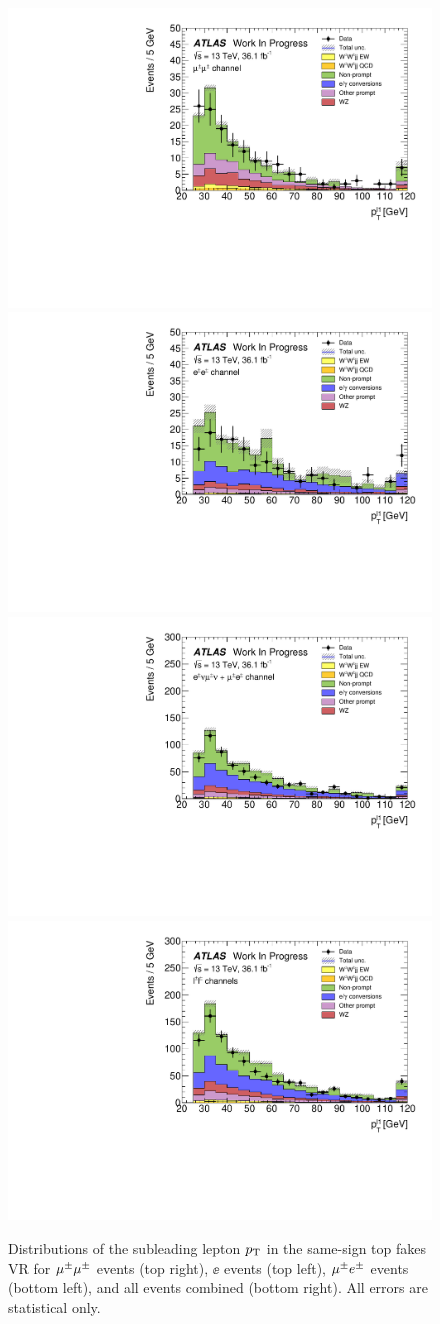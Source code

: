\begin{figure}
  \centering
  \includegraphics[width=.48\textwidth]{figs/ssww_13tev/backgrounds/ff/fakes_vr/mm-CutCRTopFakesSSZVeto-l1_pt-lin}
  \includegraphics[width=.48\textwidth]{figs/ssww_13tev/backgrounds/ff/fakes_vr/ee-CutCRTopFakesSSZVeto-l1_pt-lin}\\
  \includegraphics[width=.48\textwidth]{figs/ssww_13tev/backgrounds/ff/fakes_vr/emme-CutCRTopFakesSSZVeto-l1_pt-lin}
  \includegraphics[width=.48\textwidth]{figs/ssww_13tev/backgrounds/ff/fakes_vr/ll-CutCRTopFakesSSZVeto-l1_pt-lin}
  \caption{Distributions of the subleading lepton $p_{\mathrm{T}}$ in the same-sign top fakes VR for  $\mu^{\pm}\mu^{\pm}$ events (top right), $\ee$ events (top left), $\mu^{\pm}e^{\pm}$ events (bottom left), and all events combined (bottom right).  All errors are statistical only.}
  \label{fig:ssww13tev_ff_fakes_vr}
\end{figure} 

